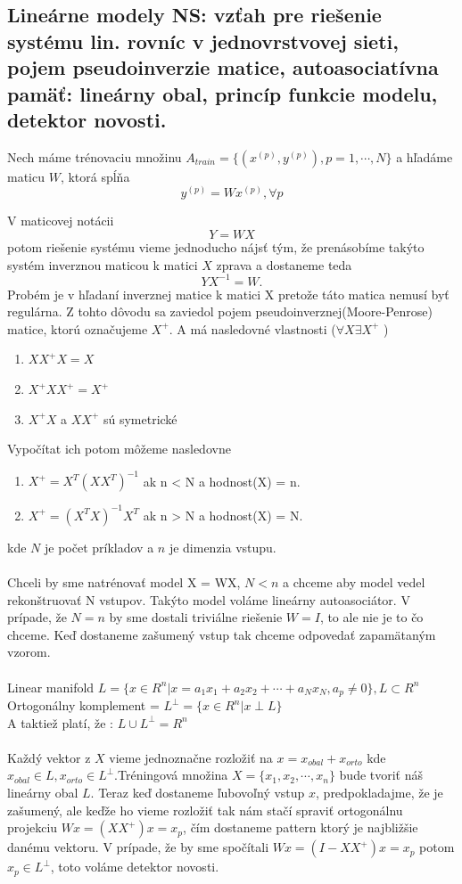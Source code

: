 \documentclass{article}
\numberwithin{equation}{section} %
\begin{document}
\subsection{Lineárne modely NS: vzťah pre riešenie systému lin. rovníc v jednovrstvovej sieti, pojem pseudoinverzie matice, autoasociatívna pamäť: lineárny obal, princíp funkcie modelu, detektor novosti.}
Nech máme trénovaciu množinu $A_{train} = \{ (x^{(p)}, y^{(p)}), p=1,\cdots,N \}$ a hľadáme maticu $W$, ktorá spĺňa $$y^{(p)} = Wx^{(p)}, \forall p$$

V maticovej notácii $$Y = WX$$ potom riešenie systému vieme jednoducho nájsť tým, že prenásobíme takýto systém inverznou maticou k matici $X$ zprava a dostaneme teda $$YX^{-1} = W.$$Probém je v hľadaní inverznej matice k matici X pretože táto matica nemusí byť regulárna. Z tohto dôvodu sa zaviedol pojem pseudoinverznej(Moore-Penrose) matice, ktorú označujeme $X^+$. A má nasledovné vlastnosti ($\forall X \exists X^+$ )
\begin{enumerate}
\item $XX^+X = X$
\item $X^+XX^+ = X^+$
\item $X^+X$ a $XX^+$ sú symetrické
\end{enumerate}
Vypočítat ich potom môžeme nasledovne
\begin{enumerate}
\item $X^+ = X^T(XX^T)^{-1}$ ak n < N a hodnost(X) = n.
\item $X^+ = (X^TX)^{-1}X^T$ ak n > N a hodnost(X) = N.
\end{enumerate}
kde $N$ je počet príkladov a $n$ je dimenzia vstupu.
\\\\
Chceli by sme natrénovať model X = WX, $N < n$ a chceme aby model vedel rekonštruovať N vstupov. Takýto model voláme lineárny autoasociátor. V prípade, že $N=n$ by sme dostali triviálne  riešenie $W = I$, to ale nie je to čo chceme. Keď dostaneme zašumený vstup tak chceme odpovedať zapamätaným vzorom. 
\\\\
Linear manifold $L = \{ x \in R^n | x = a_1x_1 + a_2x_2 + \cdots + a_Nx_N, a_p \neq 0 \} , L \subset R^n$ \\
Ortogonálny komplement = $L^{\perp} = \{x \in R^n | x \perp L\}$ \\
A taktiež platí, že : $L \cup L^\perp = R^n$
\\\\
Každý vektor z $X$ vieme jednoznačne rozložiť na $ x = x_{obal} + x_{orto}$ kde $x_{obal} \in L, x_{orto} \in L^{\perp}$.Tréningová množina $X = \{ x_1, x_2, \cdots, x_n\}$ bude tvoriť náš lineárny obal $L$. Teraz keď dostaneme ľubovoľný vstup $x$, predpokladajme, že je zašumený, ale keďže ho vieme rozložiť tak nám stačí spraviť ortogonálnu projekciu $Wx = (XX^+)x = x_p$, čím dostaneme pattern ktorý je najbližšie danému vektoru. V prípade, že by sme spočítali $Wx = (I - XX^+)x = x_p$ potom $x_p \in L^{\perp}$, toto voláme detektor novosti.
\end{document}
